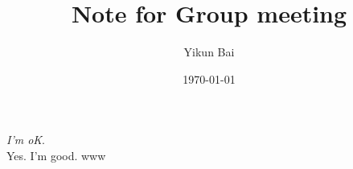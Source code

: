 ﻿\documentclass[14pt]{article}
\title{Note for Group meeting}
\author{Yikun Bai}
\date{\today}
\begin{document}
\maketitle
\cite{rigollet2018entropic}
\emph{I'm oK}.\\
Yes. I'm good. 
www

%
% 


\printbibliography
\end{document}
